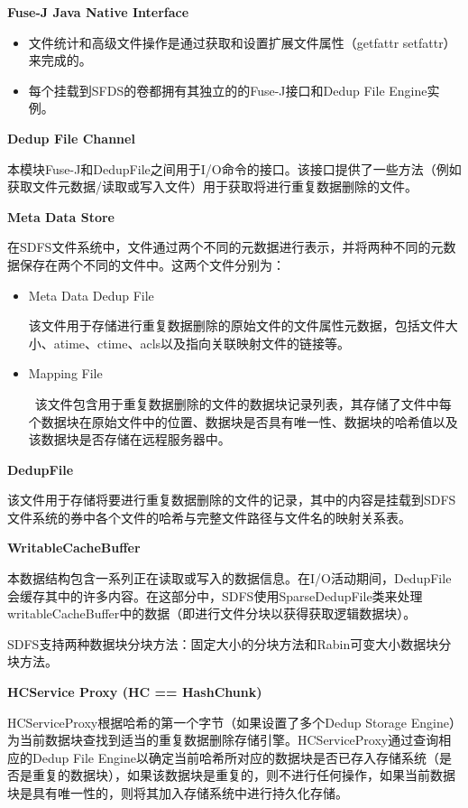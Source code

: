 \textbf{Fuse-J Java Native Interface}

\begin{itemize}
    \item 文件统计和高级文件操作是通过获取和设置扩展文件属性（getfattr setfattr）来完成的。
    \item 每个挂载到SFDS的卷都拥有其独立的的Fuse-J接口和Dedup File Engine实例。
\end{itemize}

\textbf{Dedup File Channel}

本模块Fuse-J和DedupFile之间用于I/O命令的接口。该接口提供了一些方法（例如获取文件元数据/读取或写入文件）用于获取将进行重复数据删除的文件。

\textbf{Meta Data Store}


在SDFS文件系统中，文件通过两个不同的元数据进行表示，并将两种不同的元数据保存在两个不同的文件中。这两个文件分别为：

\begin{itemize}
    \item Meta Data Dedup File
    
    该文件用于存储进行重复数据删除的原始文件的文件属性元数据，包括文件大小、atime、ctime、acls以及指向关联映射文件的链接等。
    
    \item Mapping File

     该文件包含用于重复数据删除的文件的数据块记录列表，其存储了文件中每个数据块在原始文件中的位置、数据块是否具有唯一性、数据块的哈希值以及该数据块是否存储在远程服务器中。
\end{itemize}

\textbf{DedupFile}

该文件用于存储将要进行重复数据删除的文件的记录，其中的内容是挂载到SDFS文件系统的券中各个文件的哈希与完整文件路径与文件名的映射关系表。

\textbf{WritableCacheBuffer}

本数据结构包含一系列正在读取或写入的数据信息。在I/O活动期间，DedupFile会缓存其中的许多内容。在这部分中，SDFS使用SparseDedupFile类来处理writableCacheBuffer中的数据（即进行文件分块以获得获取逻辑数据块）。

SDFS支持两种数据块分块方法：固定大小的分块方法和Rabin可变大小数据块分块方法。

\textbf{HCService Proxy (HC == HashChunk)}

HCServiceProxy根据哈希的第一个字节（如果设置了多个Dedup Storage Engine）为当前数据块查找到适当的重复数据删除存储引擎。HCServiceProxy通过查询相应的Dedup File Engine以确定当前哈希所对应的数据块是否已存入存储系统（是否是重复的数据块），如果该数据块是重复的，则不进行任何操作，如果当前数据块是具有唯一性的，则将其加入存储系统中进行持久化存储。 


